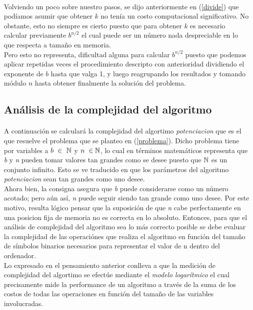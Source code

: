 \paragraph{}
Volviendo un poco sobre nuestro pasos, se dijo anteriormente en (\ref{divide}) que podíamos asumir que obtener $k$ no tenía un costo computacional significativo. No obstante, esto no siempre es cierto puesto que para obtener $k$ es necesario calcular previamente $b^{n/2}$ el cual puede ser un número nada despreciable en lo que respecta a tamaño en memoria.\\
Pero esto no representa, dificultad alguna para calcular $b^{n/2}$ puesto que podemos aplicar repetidas veces el procedimiento descripto con anterioridad dividiendo el exponente de $b$ hasta que valga 1, y luego reagrupando los resultados y tomando módulo $n$ hasta obtener finalmente la solución del problema.\\
 

\subsection{Análisis de la complejidad del algoritmo}

\paragraph{}
A continuación se calculará la complejidad del algortimo \textit{potenciacion} que es el que resuelve el problema que se planteo en (\ref{problema}). Dicho problema tiene por variables a $b\ \in\ \mathbb{N}$ y $n\ \in\mathbb{N}$, lo cual en términos matemáticos representa que \textit{b} y \textit{n} pueden tomar valores tan grandes como se desee puesto que $\mathbb{N}$ es un conjunto infinito. Esto se ve traducido en que los parámetros del algoritmo \textit{potenciacion} sean tan grandes como uno desee. \\
Ahora bien, la consigna asegura que \textit{b} puede considerarse como un número acotado; pero aún así, \textit{n} puede seguir siendo tan grande como uno desee. Por este motivo, resulta lógico pensar que la suposición de que \textit{n} cabe perfectamente en una posicion fija de memoria no es correcta en lo absoluto. Entonces, para que el análisis de complejidad del algoritmo sea lo más correcto posible se debe evaluar la complejidad de las operaciónes que realiza el algoritmo en función del tamaño de símbolos binarios necesarios para representar el valor de n dentro del ordenador.\\
Lo expresado en el pensamiento anterior conlleva a que la medición de complejidad del algortimo se efectúe mediante el \textit{modelo logarítmico} el cual precisamente mide la performance de un algoritmo a través de la suma de los costos de todas las operaciones en función del tamaño de las variables involucradas.


